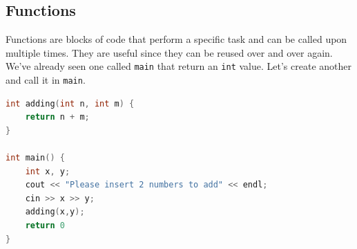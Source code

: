 \documentclass[11pt]{article}
\begin{document}
\subsection{Functions}
\noindent Functions are blocks of code that perform a specific task and can be called upon multiple times. They are useful since they can be reused over and over again. We've already seen one called \texttt{main} that return an \texttt{int} value. Let's create another and call it in \texttt{main}.

\begin{lstlisting}[language=c, mathescape=true]
int adding(int n, int m) {
    return n + m;
}

int main() {
    int x, y;
    cout << "Please insert 2 numbers to add" << endl;
    cin >> x >> y;
    adding(x,y);
    return 0
}
\end{lstlisting}
\end{document}

